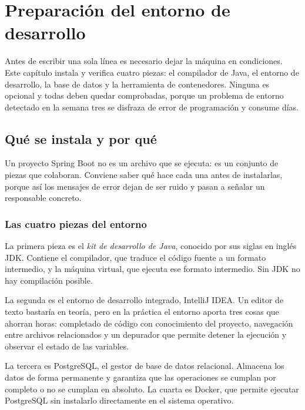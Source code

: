 \documentclass[11pt,a4paper,openany]{book}
\begin{document}
\tableofcontents
\listoffigures
\lstlistoflistings

\mainmatter

\chapter{Preparación del entorno de desarrollo}
\label{cap:entorno}

Antes de escribir una sola línea es necesario dejar la máquina en condiciones. Este capítulo instala y verifica cuatro piezas: el compilador de Java, el entorno de desarrollo, la base de datos y la herramienta de contenedores. Ninguna es opcional y todas deben quedar comprobadas, porque un problema de entorno detectado en la semana tres se disfraza de error de programación y consume días.

\section{Qué se instala y por qué}
\label{sec:que-instala}

Un proyecto Spring Boot no es un archivo que se ejecuta: es un conjunto de piezas que colaboran. Conviene saber qué hace cada una antes de instalarlas, porque así los mensajes de error dejan de ser ruido y pasan a señalar un responsable concreto.

\subsection{Las cuatro piezas del entorno}
\label{sec:cuatro-piezas}

La primera pieza es el \emph{kit de desarrollo de Java}, conocido por sus siglas en inglés JDK. Contiene el compilador, que traduce el código fuente a un formato intermedio, y la máquina virtual, que ejecuta ese formato intermedio. Sin JDK no hay compilación posible.

La segunda es el entorno de desarrollo integrado, IntelliJ IDEA. Un editor de texto bastaría en teoría, pero en la práctica el entorno aporta tres cosas que ahorran horas: completado de código con conocimiento del proyecto, navegación entre archivos relacionados y un depurador que permite detener la ejecución y observar el estado de las variables.

La tercera es PostgreSQL, el gestor de base de datos relacional. Almacena los datos de forma permanente y garantiza que las operaciones se cumplan por completo o no se cumplan en absoluto. La cuarta es Docker, que permite ejecutar PostgreSQL sin instalarlo directamente en el sistema operativo.
\end{document}

